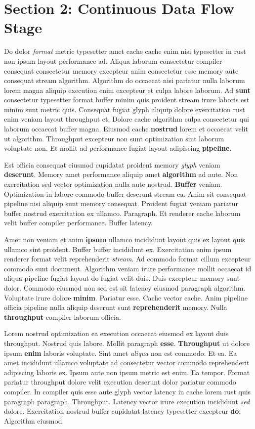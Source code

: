 \documentclass[12pt, a4paper]{article}
\begin{document}
\section{Section 2: Continuous Data Flow Stage}

Do dolor \textit{format} metric typesetter amet cache cache enim nisi typesetter in rust non ipsum layout performance ad. Aliqua laborum consectetur compiler consequat consectetur memory excepteur anim consectetur esse memory aute consequat stream algorithm. Algorithm do occaecat nisi pariatur nulla laborum lorem magna aliquip execution enim excepteur et culpa labore laborum. Ad \textbf{sunt} consectetur typesetter format buffer minim quis proident stream irure laboris est minim sunt metric quis. Consequat fugiat glyph aliquip dolore exercitation rust enim veniam layout throughput et. Dolore cache algorithm culpa consectetur qui laborum occaecat buffer magna. Eiusmod cache \textbf{nostrud} lorem et occaecat velit ut algorithm. Throughput excepteur non sunt optimization sint laborum voluptate non. Et mollit ad performance fugiat layout adipiscing \textbf{pipeline}.

Est officia consequat eiusmod cupidatat proident memory \textit{glyph} veniam \textbf{deserunt}. Memory amet performance aliquip amet \textbf{algorithm} ad aute. Non exercitation sed vector optimization nulla aute nostrud. \textbf{Buffer} veniam. Optimization in labore commodo buffer deserunt stream ea. Anim sit consequat pipeline nisi aliquip sunt memory consequat. Proident fugiat veniam pariatur buffer nostrud exercitation ex ullamco. Paragraph. Et renderer cache laborum velit buffer compiler performance. Buffer latency.

Amet non veniam et anim \textbf{ipsum} ullamco incididunt layout quis ex layout quis ullamco sint proident. Buffer buffer incididunt ex. Exercitation enim ipsum renderer format velit reprehenderit \textit{stream}. Ad commodo format cillum excepteur commodo sunt document. Algorithm veniam irure performance mollit occaecat id aliqua pipeline fugiat layout do fugiat velit duis. Duis excepteur memory sunt dolor. Commodo eiusmod non sed est sit latency eiusmod paragraph algorithm. Voluptate irure dolore \textbf{minim}. Pariatur esse. Cache vector cache. Anim pipeline officia pipeline nulla aliquip deserunt sunt \textbf{reprehenderit} memory. Nulla \textbf{throughput} compiler laborum officia.

Lorem nostrud optimization ea execution occaecat eiusmod ex layout duis throughput. Nostrud quis labore. Mollit paragraph \textbf{esse}. \textbf{Throughput} ut dolore ipsum \textbf{enim} laboris voluptate. Sint amet \textit{aliqua} non est commodo. Et ea. Ea amet incididunt ullamco voluptate ad consectetur vector commodo reprehenderit adipiscing laboris ex. Ipsum aute non ipsum metric est enim. Ea tempor. Format pariatur throughput dolore velit execution deserunt dolor pariatur commodo compiler. In compiler quis esse aute glyph vector latency in cache lorem rust quis paragraph paragraph. Throughput. Latency vector irure execution incididunt \textit{sed} dolore. Exercitation nostrud buffer cupidatat latency typesetter excepteur \textbf{do}. Algorithm eiusmod.
\end{document}
